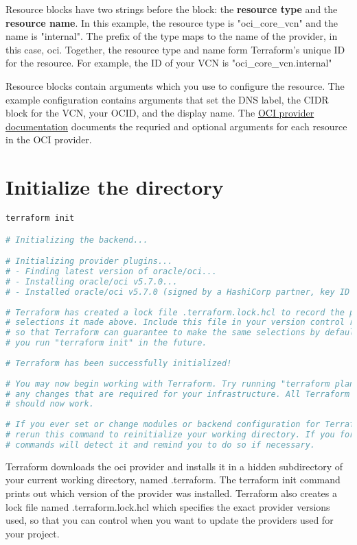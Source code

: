 \documentclass[../main.tex]{subfiles}
\begin{document}
Resource blocks have two strings before the block: the \textbf{resource type} and the \textbf{resource name}.
In this example, the resource type is "oci\_core\_vcn" and the name is "internal".
The prefix of the type maps to the name of the provider, in this case, oci. 
Together, the resource type and name form Terraform's unique ID for the resource. For example, the ID of your \gls{VCN} is "oci\_core\_vcn.internal"

Resource blocks contain arguments which you use to configure the resource. The example configuration contains arguments that set the \gls{DNS} label, the \gls{CIDR} block for the \gls{VCN}, your \gls{OCID}, and the display name.
The \href{https://registry.terraform.io/providers/oracle/oci/latest}{OCI provider documentation} documents the requried and optional arguments for each resource in the \gls{OCI} provider.

\section{Initialize the directory}
\begin{lstlisting}[language=bash]
terraform init

# Initializing the backend...

# Initializing provider plugins...
# - Finding latest version of oracle/oci...
# - Installing oracle/oci v5.7.0...
# - Installed oracle/oci v5.7.0 (signed by a HashiCorp partner, key ID 1533A49284137CEB)
 
# Terraform has created a lock file .terraform.lock.hcl to record the provider
# selections it made above. Include this file in your version control repository
# so that Terraform can guarantee to make the same selections by default when
# you run "terraform init" in the future.
 
# Terraform has been successfully initialized!
 
# You may now begin working with Terraform. Try running "terraform plan" to see
# any changes that are required for your infrastructure. All Terraform commands
# should now work.
 
# If you ever set or change modules or backend configuration for Terraform,
# rerun this command to reinitialize your working directory. If you forget, other
# commands will detect it and remind you to do so if necessary.
\end{lstlisting}
Terraform downloads the oci provider and installs it in a hidden subdirectory of your current working directory, named .terraform. The terraform init command prints out which version of the provider was installed. Terraform also creates a lock file named .terraform.lock.hcl which specifies the exact provider versions used, so that you can control when you want to update the providers used for your project.

\printglossaries
\end{document}
